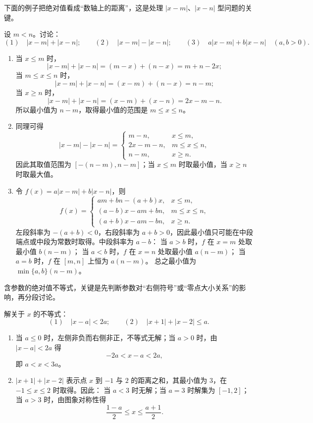 下面的例子把绝对值看成“数轴上的距离”，这是处理 \(|x-m|\)、\(|x-n|\) 型问题的关键。
\begin{example}[绝对值表达式的几何意义]
  设 \(m<n\)。讨论：
  \[
  (1)\quad |x-m|+|x-n|;\qquad
  (2)\quad |x-m|-|x-n|;\qquad
  (3)\quad a|x-m|+b|x-n|\quad(a,b>0).
  \]
\end{example}
\begin{jie}
  \begin{enumerate}
    \item 当 \(x\le m\) 时，
    \[
    |x-m|+|x-n|=(m-x)+(n-x)=m+n-2x;
    \]
    当 \(m\le x\le n\) 时，
    \[
    |x-m|+|x-n|=(x-m)+(n-x)=n-m;
    \]
    当 \(x\ge n\) 时，
    \[
    |x-m|+|x-n|=(x-m)+(x-n)=2x-m-n.
    \]
    所以最小值为 \(n-m\)，取得最小值的范围是 \(m\le x\le n\)。
    \item 同理可得
    \[
    |x-m|-|x-n|=
    \begin{cases}
      m-n,&x\le m,\\
      2x-m-n,&m\le x\le n,\\
      n-m,&x\ge n.
    \end{cases}
    \]
    因此其取值范围为 \([-(n-m),n-m]\)；当 \(x\le m\) 时取最小值，当 \(x\ge n\) 时取最大值。
    \item 令 \(f(x)=a|x-m|+b|x-n|\)，则
    \[
    f(x)=
    \begin{cases}
      am+bn-(a+b)x,&x\le m,\\
      (a-b)x-am+bn,&m\le x\le n,\\
      (a+b)x-am-bn,&x\ge n.
    \end{cases}
    \]
    左段斜率为 \(-(a+b)<0\)，右段斜率为 \(a+b>0\)，因此最小值只可能在中段端点或中段为常数时取得。中段斜率为 \(a-b\)：
    当 \(a>b\) 时，\(f\) 在 \(x=m\) 处取最小值 \(b(n-m)\)；
    当 \(a<b\) 时，\(f\) 在 \(x=n\) 处取最小值 \(a(n-m)\)；
    当 \(a=b\) 时，\(f\) 在 \([m,n]\) 上恒为 \(a(n-m)\)。
    总之最小值为 \(\min\{a,b\}(n-m)\)。
  \end{enumerate}
\end{jie}
含参数的绝对值不等式，关键是先判断参数对“右侧符号”或“零点大小关系”的影响，再分段讨论。
\begin{example}[含参数的绝对值不等式]
  解关于 \(x\) 的不等式：
  \[
  (1)\quad |x-a|<2a;\qquad
  (2)\quad |x+1|+|x-2|\le a.
  \]
\end{example}
\begin{jie}
  \begin{enumerate}
    \item 当 \(a\le0\) 时，左侧非负而右侧非正，不等式无解；当 \(a>0\) 时，由 \(|x-a|<2a\) 得
    \[
    -2a<x-a<2a,
    \]
    即 \(a<x<3a\)。
    \item \(|x+1|+|x-2|\) 表示点 \(x\) 到 \(-1\) 与 \(2\) 的距离之和，其最小值为 \(3\)，在 \(-1\le x\le2\) 时取得。因此：
    当 \(a<3\) 时无解；当 \(a=3\) 时解集为 \([-1,2]\)；当 \(a>3\) 时，由图象对称性得
    \[
    \frac{1-a}{2}\le x\le\frac{a+1}{2}.
    \]
  \end{enumerate}
\end{jie}
